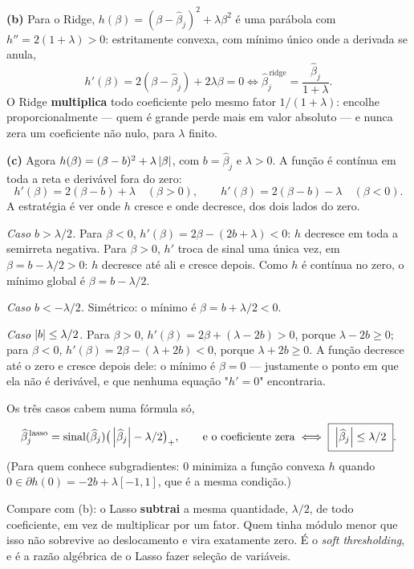 \begin{solucao}
\smallskip
\textbf{(b)} Para o Ridge, $h(\beta)=(\beta-\widehat\beta_j)^2+\lambda\beta^2$ é uma
parábola com $h''=2(1+\lambda)>0$: estritamente convexa, com mínimo único onde a
derivada se anula,
\[
  h'(\beta)=2(\beta-\widehat\beta_j)+2\lambda\beta=0
  \iff
  \widehat\beta_j^{\,\text{ridge}}=\frac{\widehat\beta_j}{1+\lambda}.
\]
O Ridge \textbf{multiplica} todo coeficiente pelo mesmo fator $1/(1+\lambda)$: encolhe
proporcionalmente --- quem é grande perde mais em valor absoluto --- e nunca zera um
coeficiente não nulo, para $\lambda$ finito.

\smallskip
\textbf{(c)} Agora $h(\beta)=(\beta-b)^2+\lambda\left\lvert \beta \right\rvert$, com $b=\widehat\beta_j$ e
$\lambda>0$. A função é contínua em toda a reta e derivável fora do zero:
\[
  h'(\beta)=2(\beta-b)+\lambda\quad(\beta>0),
  \qquad
  h'(\beta)=2(\beta-b)-\lambda\quad(\beta<0).
\]
A estratégia é ver onde $h$ cresce e onde decresce, dos dois lados do zero.

\emph{Caso $b>\lambda/2$.} Para $\beta<0$, $h'(\beta)=2\beta-(2b+\lambda)<0$: $h$
decresce em toda a semirreta negativa. Para $\beta>0$, $h'$ troca de sinal uma única
vez, em $\beta=b-\lambda/2>0$: $h$ decresce até ali e cresce depois. Como $h$ é
contínua no zero, o mínimo global é $\beta=b-\lambda/2$.

\emph{Caso $b<-\lambda/2$.} Simétrico: o mínimo é $\beta=b+\lambda/2<0$.

\emph{Caso $\left\lvert b \right\rvert\le\lambda/2$.} Para $\beta>0$, $h'(\beta)=2\beta+(\lambda-2b)>0$,
porque $\lambda-2b\ge0$; para $\beta<0$, $h'(\beta)=2\beta-(\lambda+2b)<0$, porque
$\lambda+2b\ge0$. A função decresce até o zero e cresce depois dele: o mínimo é
$\beta=0$ --- justamente o ponto em que ela não é derivável, e que nenhuma equação
"$h'=0$" encontraria.

Os três casos cabem numa fórmula só,
\[
  \widehat\beta_j^{\,\text{lasso}}
  =\operatorname{sinal}(\widehat\beta_j)\big(\left\lvert \widehat\beta_j \right\rvert-\lambda/2\big)_+ ,
  \qquad\text{e o coeficiente zera}\iff
  \boxed{\;\left\lvert \widehat\beta_j \right\rvert\le\lambda/2\;}.
\]
(Para quem conhece subgradientes: $0$ minimiza a função convexa $h$ quando
$0\in\partial h(0)=-2b+\lambda[-1,1]$, que é a mesma condição.)

Compare com (b): o Lasso \textbf{subtrai} a mesma quantidade, $\lambda/2$, de todo
coeficiente, em vez de multiplicar por um fator. Quem tinha módulo menor que isso não
sobrevive ao deslocamento e vira exatamente zero. É o \emph{soft thresholding}, e é a
razão algébrica de o Lasso fazer seleção de variáveis.


\end{solucao}
